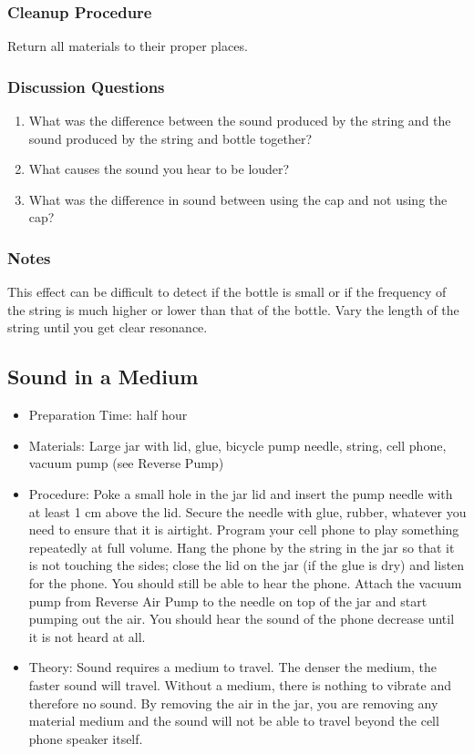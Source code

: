 \subsubsection*{Cleanup Procedure}
Return all materials to their proper places.

\subsubsection*{Discussion Questions}
\begin{enumerate}
\item{What was the difference between the sound produced by the string and the sound produced by the string and bottle together?}
\item{What causes the sound you hear to be louder?}
\item{What was the difference in sound between using the cap and not using the cap?}
\end{enumerate}

\subsubsection*{Notes}
This effect can be difficult to detect if the bottle is small or if the frequency of the string is much higher or lower than that of the bottle.  Vary the length of the string until you get clear resonance.


\subsection{Sound in a Medium}
\begin{itemize}
\item{Preparation Time: half hour}
\item{Materials: Large jar with lid, glue, bicycle pump needle, string, cell phone, vacuum pump (see Reverse Pump)}
\item{Procedure: Poke a small hole in the jar lid and insert the pump needle with at least 1 cm above the lid. Secure the needle with glue, rubber, whatever you need to ensure that it is airtight. Program your cell phone to play something repeatedly at full volume. Hang the phone by the string in the jar so that it is not touching the sides; close the lid on the jar (if the glue is dry) and listen for the phone. You should still be able to hear the phone. Attach the vacuum pump from Reverse Air Pump to the needle on top of the jar and start pumping out the air. You should hear the sound of the phone decrease until it is not heard at all.}
\item{Theory: Sound requires a medium to travel. The denser the medium, the faster sound will travel. Without a medium, there is nothing to vibrate and therefore no sound. By removing the air in the jar, you are removing any material medium and the sound will not be able to travel beyond the cell phone speaker itself.}
\end{itemize}


